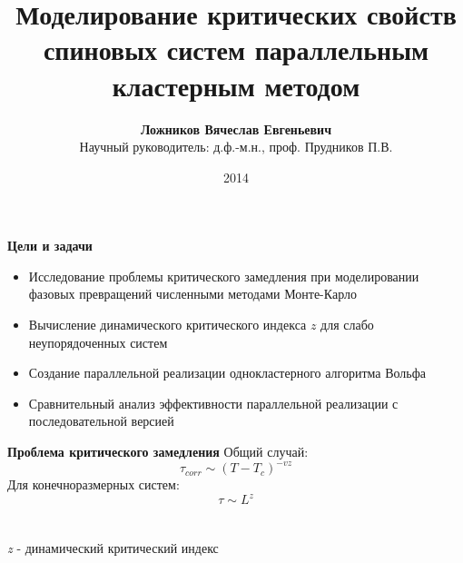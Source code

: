 \documentclass{beamer}
\title
{\textbf{Моделирование критических свойств спиновых систем параллельным кластерным методом}}
\author
{\textbf{Ложников Вячеслав Евгеньевич}\texorpdfstring{\\Научный руководитель: д.ф.-м.н., проф. Прудников П.В.}{}}
\institute
{
\inst{}
Кафедра теоретической физики\\
ОмГУ им. Ф.М. Достоевского}
\date
{2014}
\begin{document}
\begin{frame}
  \titlepage
\end{frame}


\begin{frame}{\textbf{Цели и задачи}}
\begin{itemize}
    \item Исследование проблемы критического замедления при моделировании
    фазовых превращений численными методами Монте-Карло
    \item Вычисление динамического критического индекса $z$ для слабо
    неупорядоченных систем
    \item Создание параллельной реализации однокластерного алгоритма Вольфа
    \item Сравнительный анализ эффективности параллельной реализации с
    последовательной версией
\end{itemize}
\end{frame}

\begin{frame}{\textbf{Проблема критического замедления\footnotemark[1]}}
Общий случай:
\begin{equation}
	\tau_{corr} \sim \left( T - T_c \right)^{-vz}
\end{equation}
Для конечноразмерных систем:
\begin{equation}
	\tau \sim L^z
\end{equation}
\\
\\
\textit{z} - динамический критический индекс
\end{frame}
\end{document}
